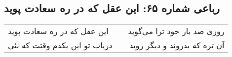 \begin{center}
\section*{رباعی شماره ۶۵: این عقل که در ره سعادت پوید}
\label{sec:sh065}
\begin{longtable}{l p{0.5cm} r}
این عقل که در ره سعادت پوید
&&
روزی صد بار خود ترا می‌گوید
\\
دریاب تو این یکدم وقتت که نئی
&&
آن تره که بدروند و دیگر روید
\\
\end{longtable}
\end{center}
